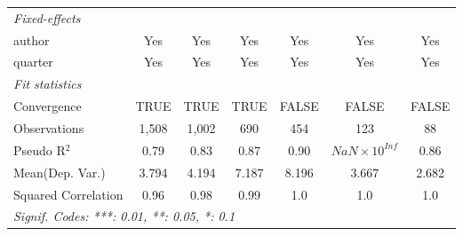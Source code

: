 \begin{tabular}{lcccccc}
   \midrule
   \emph{Fixed-effects}\\
   author                                                     & Yes          & Yes           & Yes          & Yes           & Yes                    & Yes\\  
   quarter                                                    & Yes          & Yes           & Yes          & Yes           & Yes                    & Yes\\  
   \midrule
   \emph{Fit statistics}\\
   Convergence                                                &TRUE          & TRUE          & TRUE         & FALSE         & FALSE                  & FALSE\\  
   Observations                                               & 1,508        & 1,002         & 690          & 454           & 123                    & 88\\  
   Pseudo R$^2$                                               & 0.79         & 0.83          & 0.87         & 0.90          & $NaN\times 10^{Inf}$   & 0.86\\  
Mean(Dep. Var.) & 3.794 & 4.194 & 7.187 & 8.196 & 3.667 & 2.682 \\
   Squared Correlation                                        & 0.96         & 0.98          & 0.99         & 1.0           & 1.0                    & 1.0\\  
   \midrule \midrule
   \multicolumn{7}{l}{\emph{Signif. Codes: ***: 0.01, **: 0.05, *: 0.1}}\\
\end{tabular}
\par\endgroup
